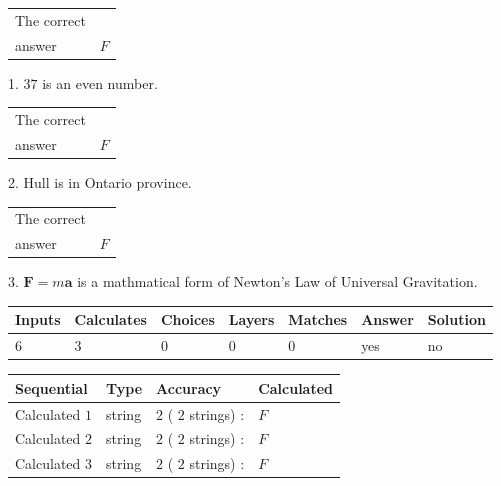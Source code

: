 \documentclass[12pt]{article}
\begin{document}
 
\noindent\begin{tabular}{|l|l|}\hline The correct & \\
          answer &  %
$F$ \\ \hline \end{tabular}
1. $ %
37$ is an  %
even number.
 
\noindent\begin{tabular}{|l|l|}\hline The correct & \\
          answer &  %
$F$ \\ \hline \end{tabular}
2.  %
Hull is in  %
Ontario province.
 
\noindent\begin{tabular}{|l|l|}\hline The correct & \\
          answer &  %
$F$ \\ \hline \end{tabular}
3.  %
$\mathbf{F}=m\mathbf{a}$ is a mathmatical form of  %
Newton's Law of Universal Gravitation.
 
 
 
\noindent{}
 
 

 
\vspace{0.3in}
   
   
   
   
\noindent\begin{tabular}{|l|l|l|l|l|l|l|}
 \hline
Inputs & Calculates & Choices & Layers & Matches & Answer & Solution \\ \hline
           6 & 
           3 & 
           0
  & 
           0 & 
           0 & 
  yes & 
  no 
  \\ \hline
 \end{tabular}
   
   
   
   
\noindent{}
   
   
  
  
\noindent\begin{tabular}{|l|l|l|l|}
\hline
 Sequential & Type & Accuracy & Calculated \\ 
\hline
 
 
  Calculated $           1$ & string & $           2 $ ( $          2 $ strings)
 : 
 & $F$
 \\  \hline  
 
 
  Calculated $           2$ & string & $           2 $ ( $          2 $ strings)
 : 
 & $F$
 \\  \hline  
 
 
  Calculated $           3$ & string & $           2 $ ( $          2 $ strings)
 : 
 & $F$
 \\  \hline  
 \end{tabular}
   
\end{document}
